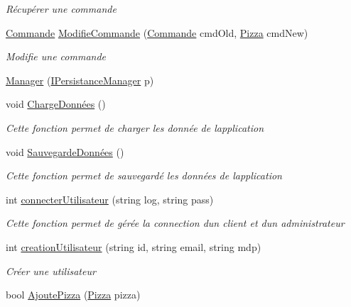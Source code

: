 \begin{DoxyCompactItemize}
\begin{DoxyCompactList}\small\item\em Récupérer une commande \end{DoxyCompactList}\item 
\hyperlink{classModele_1_1Commande}{Commande} \hyperlink{classModele_1_1Manager_a4baa269969e367de8472b7521ab3fa93}{Modifie\+Commande} (\hyperlink{classModele_1_1Commande}{Commande} cmd\+Old, \hyperlink{classModele_1_1Pizza}{Pizza} cmd\+New)
\begin{DoxyCompactList}\small\item\em Modifie une commande \end{DoxyCompactList}\item 
\hyperlink{classModele_1_1Manager_aa088a20e96bca5adaa3305f2245f99f3}{Manager} (\hyperlink{interfaceModele_1_1IPersistanceManager}{I\+Persistance\+Manager} p)
\item 
void \hyperlink{classModele_1_1Manager_af864593f2ec5d93e298e54c838316bd6}{Charge\+Données} ()
\begin{DoxyCompactList}\small\item\em Cette fonction permet de charger les donnée de l\textquotesingle{}application \end{DoxyCompactList}\item 
void \hyperlink{classModele_1_1Manager_a1401389e33f047e9fd896ee0383fd01f}{Sauvegarde\+Données} ()
\begin{DoxyCompactList}\small\item\em Cette fonction permet de sauvegardé les données de l\textquotesingle{}application \end{DoxyCompactList}\item 
int \hyperlink{classModele_1_1Manager_ad2af53ab1af0c7def106a31ea70dd1e9}{connecter\+Utilisateur} (string log, string pass)
\begin{DoxyCompactList}\small\item\em Cette fonction permet de gérée la connection d\textquotesingle{}un client et d\textquotesingle{}un administrateur \end{DoxyCompactList}\item 
int \hyperlink{classModele_1_1Manager_ab8af03a34711cbfec2f0cf3a1ee8fbac}{creation\+Utilisateur} (string id, string email, string mdp)
\begin{DoxyCompactList}\small\item\em Créer une utilisateur \end{DoxyCompactList}\item 
bool \hyperlink{classModele_1_1Manager_a91d346733b3a19baa89d09e4c5599345}{Ajoute\+Pizza} (\hyperlink{classModele_1_1Pizza}{Pizza} pizza)

\end{DoxyCompactItemize}
